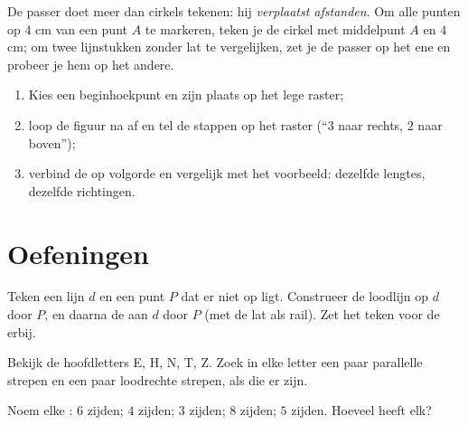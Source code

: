 \begin{example}\label{ex:g4:geometry:compass}
De passer doet meer dan cirkels tekenen: hij \emph{verplaatst afstanden}.
Om alle punten op $4$ cm van een punt $A$ te markeren, teken je de cirkel
met middelpunt $A$ en  $4$ cm; om twee lijnstukken zonder lat te
vergelijken, zet je de passer op het ene en probeer je hem op het andere.
\end{example}

\begin{method}\label{met:g4:geometry:reproduce}
\begin{enumerate}
  \item Kies een beginhoekpunt en zijn plaats op het lege raster;
  \item loop de figuur  na  af en tel de stappen op het
        raster (``$3$ naar rechts, $2$ naar boven'');
  \item verbind de  op volgorde en vergelijk met het voorbeeld:
        dezelfde lengtes, dezelfde richtingen.
\end{enumerate}
\end{method}

\section{Oefeningen}

\begin{exercise}[$\star$]\label{exo:g4:geometry:1}
Teken een lijn $d$ en een punt $P$ dat er niet op ligt. Construeer de
loodlijn op $d$ door $P$, en daarna de  aan $d$ door $P$ (met de
lat als rail). Zet het teken voor de  erbij.
\end{exercise}

\begin{exercise}[$\star$]\label{exo:g4:geometry:2}
Bekijk de hoofdletters E, H, N, T, Z. Zoek in elke letter een paar
parallelle strepen en een paar loodrechte strepen, als die er zijn.
\end{exercise}

\begin{exercise}[$\star$]\label{exo:g4:geometry:3}
Noem elke : $6$ zijden; $4$ zijden; $3$ zijden; $8$ zijden; $5$
zijden. Hoeveel \emph{} heeft elk?
\end{exercise}

